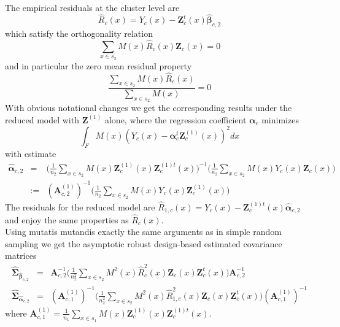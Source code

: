\documentclass[a4paper,12pt,leqno, titlepage]{article}
\begin{document}
{{\begin{eqnarray}
 \end{eqnarray}
 The empirical residuals at the cluster level are
 $$\hat{R}_{c}(x)=Y_c(x)-\pmb{Z}^t_c(x)\hat{\pmb{\beta}}_{c,2}$$
 which satisfy the orthogonality relation
 $$\sum_{x\in{s_2}}M(x)\hat{R}_c(x)\pmb{Z}_c(x)=0$$
 and in particular the zero mean residual property
$$\frac{\sum_{x\in{s_2}}M(x)\hat{R}_c(x)}{\sum_{x\in{s_2}}M(x)}=0$$
With obvious notational changes we get the corresponding results under the reduced model with
$\pmb{Z}^{(1)}$ alone, where the regression coefficient $\pmb{\alpha}_c$ minimizes
$$\int_F M(x)(Y_c(x)-\pmb{\alpha}_c^{t}\pmb{Z}^{(1)}_c(x))^2dx$$
with estimate
\begin{eqnarray}\label{estalphacluster1}
 \hat{\pmb{\alpha}}_{c,2}&=&
 \Big(\frac{1}{n_2}\sum_{x\in{s_2}}M(x)\pmb{Z}^{(1)}_c(x)\pmb{Z}_c^{(1)t}(x)\Big)^{-1}\Big(\frac{1}{n_2}\sum_{x\in{s_2}}M(x)Y_c(x)\pmb{Z}_c(x)\Big)
 \nonumber\\
 &:=&(\pmb{A}^{(1)}_{c,2})^{-1}\Big(\frac{1}{n_2}\sum_{x\in{s_2}}M(x)Y_c(x)\pmb{Z}^{(1)}_c(x)\Big)
 \end{eqnarray}
 The residuals for the reduced model are $\hat{R}_{1,c}(x)=Y_c(x)-\pmb{Z}^{(1)t}_c(x)\hat{\pmb{\alpha}}_{c,2}$ and enjoy the same properties as
 $\hat{R}_{c}(x)$.\\
 \noindent Using mutatis mutandis exactly the same arguments as in simple random sampling we get the asymptotic robust design-based estimated covariance matrices
\begin{eqnarray}\label{estcovmatrixcluster1}
\hat{\pmb{\Sigma}}_{\hat{\pmb{\beta}}_{c,2}}&=&\pmb{A}^{-1}_{c,2}\Big(\frac{1}{n^2_2}\sum_{x\in{s_2}}M^2(x)\hat{R}^2_c(x)
\pmb{Z}_c(x)\pmb{Z}^t_c(x)\Big)\pmb{A}^{-1}_{c,2}\nonumber \\
\hat{\pmb{\Sigma}}_{\hat{\pmb{\alpha}}_{c,2}}&=&(\pmb{A}^{(1)}_{c,1})^{-1}\Big(\frac{1}{n^2_2}\sum_{x\in{s_2}}M^2(x)\hat{R}_{1,c}^2(x)
\pmb{Z}_c(x)\pmb{Z}^t_c(x)\Big)(\pmb{A}^{(1)}_{c,1})^{-1}
\end{eqnarray}
where $\pmb{A}^{(1)}_{c,1}=\frac{1}{n_1}\sum_{x\in{s_1}}M(x)\pmb{Z}^{(1)}_c(x)\pmb{Z}_c^{(1)t}(x)$.\\

}}
\end{document}
